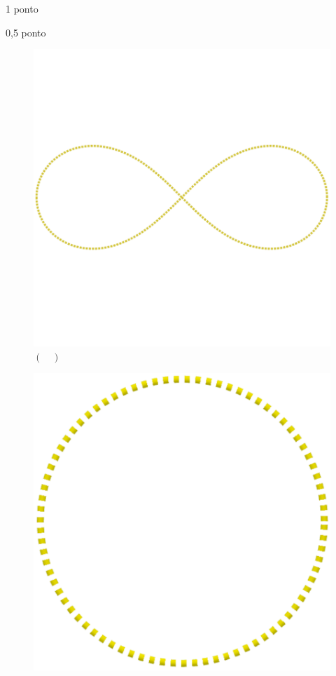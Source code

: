 \documentclass{../lista}
\begin{document}
\begin{questao}{1 ponto}
\begin{pergunta}{0,5 ponto}
			\begin{multicols}{2}
				\begin{figure}[H]
					\centering
					\includegraphics[scale=0.15]{./img/5a}
					\captionsetup{labelformat=empty}
					\caption{$(\quad)$}
				\end{figure}
				\begin{figure}[H]
					\centering
					\includegraphics[scale=0.15]{./img/5b}

\end{figure}
\end{multicols}
\end{pergunta}
\end{questao}
\end{document}
